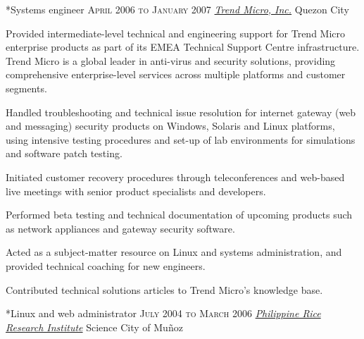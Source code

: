 \documentclass[10pt, a4paper, final]{article}
\begin{document}
\begin{section}
\begin{subsection}
\begin{compactitem}
    \end{compactitem}
  \end{subsection}
  \vspace{2.5em}

  \begin{subsection}*{Systems engineer \hfill\textsc{April 2006 to January 2007}}
    \href{http://www.trendmicro.com}{\textit{Trend Micro, Inc.}} \hfill Quezon City
    \vspace{1em}

    Provided intermediate-level technical and engineering support for Trend Micro enterprise products as part of its EMEA Technical Support Centre infrastructure. Trend Micro is a global leader in anti-virus and security solutions, providing comprehensive enterprise-level services across multiple platforms and customer segments.
    \vspace{1em}
    \begin{compactitem}
      \item Handled troubleshooting and technical issue resolution for internet gateway (web and messaging) security products on Windows, Solaris and Linux platforms, using intensive testing procedures and set-up of lab environments for simulations and software patch testing.
      \item Initiated customer recovery procedures through teleconferences and web-based live meetings with senior product specialists and developers.
      \item Performed beta testing and technical documentation of upcoming products such as network appliances and gateway security software.
      \item Acted as a subject-matter resource on Linux and systems administration, and provided technical coaching for new engineers.
      \item Contributed technical solutions articles to Trend Micro's knowledge base.
      
    \end{compactitem}
  \end{subsection}
  \vspace{2.5em}

  \begin{subsection}*{Linux and web administrator \hfill\textsc{July 2004 to March 2006}}
    \href{http://www.philrice.gov.ph}{\textit{Philippine Rice Research Institute}} \hfill Science City of Mu{\~n}oz
    \vspace{1em}


\end{subsection}
\end{section}
\end{document}
